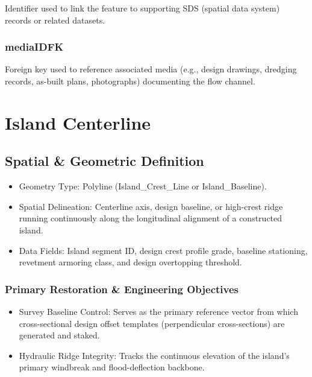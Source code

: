 \documentclass[
  letterpaper,
  DIV=11,
  numbers=noendperiod]{scrreprt}
\begin{document}
Identifier used to link the feature to supporting SDS (spatial data
system) records or related datasets.

\subsection{mediaIDFK}\label{mediaidfk-5}

Foreign key used to reference associated media (e.g., design drawings,
dredging records, as-built plans, photographs) documenting the flow
channel.

\chapter{Island Centerline}\label{island-centerline}

\section{Spatial \& Geometric
Definition}\label{spatial-geometric-definition-6}

\begin{itemize}
\item
  Geometry Type: Polyline (Island\_Crest\_Line or Island\_Baseline).
\item
  Spatial Delineation: Centerline axis, design baseline, or high-crest
  ridge running continuously along the longitudinal alignment of a
  constructed island.
\item
  Data Fields: Island segment ID, design crest profile grade, baseline
  stationing, revetment armoring class, and design overtopping
  threshold.
\end{itemize}

\subsection{Primary Restoration \& Engineering
Objectives}\label{primary-restoration-engineering-objectives-5}

\begin{itemize}
\item
  Survey Baseline Control: Serves as the primary reference vector from
  which cross-sectional design offset templates (perpendicular
  cross-sections) are generated and staked.
\item
  Hydraulic Ridge Integrity: Tracks the continuous elevation of the
  island's primary windbreak and flood-deflection backbone.
\end{itemize}
\end{document}
